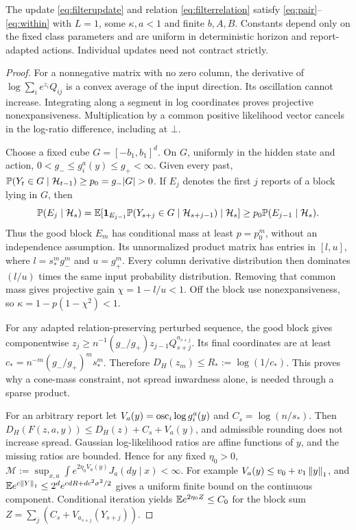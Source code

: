 \begin{lemma}\label{lem:filterblock}
The update \eqref{eq:filterupdate} and relation \eqref{eq:filterrelation} satisfy \eqref{eq:pair}--\eqref{eq:within} with $L=1$, some $\kappa,a<1$ and finite $b,A,B$. Constants depend only on the fixed class parameters and are uniform in deterministic horizon and report-adapted actions. Individual updates need not contract strictly.
\end{lemma}
\begin{proof}
For a nonnegative matrix with no zero column, the derivative of $\log\sum_i e^{z_i}Q_{ij}$ is a convex average of the input direction. Its oscillation cannot increase. Integrating along a segment in log coordinates proves projective nonexpansiveness. Multiplication by a common positive likelihood vector cancels in the log-ratio difference, including at $\bot$.

Choose a fixed cube $G=[-b_1,b_1]^d$. On $G$, uniformly in the hidden state and action, $0<g_-\le g_i^a(y)\le g_+<\infty$. Given every past, $\PP(Y_t\in G\mid\mathcal H_{t-1})\ge p_0=g_-|G|>0$. If $E_j$ denotes the first $j$ reports of a block lying in $G$, then
\[
 \mathbb P(E_j\mid\mathcal H_s)
 =\mathbb E[\mathbf 1_{E_{j-1}}\mathbb P(Y_{s+j}\in G\mid\mathcal H_{s+j-1})\mid\mathcal H_s]
 \ge p_0\mathbb P(E_{j-1}\mid\mathcal H_s).
\]
Thus the good block $E_m$ has conditional mass at least $p=p_0^m$, without an independence assumption. Its unnormalized product matrix has entries in $[l,u]$, where $l=s_*^m g_-^m$ and $u=g_+^m$. Every column derivative distribution then dominates $(l/u)$ times the same input probability distribution. Removing that common mass gives projective gain $\chi=1-l/u<1$. Off the block use nonexpansiveness, so $\kappa=1-p(1-\chi^2)<1$.

For any adapted relation-preserving perturbed sequence, the good block gives componentwise
$z_j\ge n^{-1}(g_-/g_+)z_{j-1}Q_{s+j}^{a_{s+j}}$.
Its final coordinates are at least $c_*=n^{-m}(g_-/g_+)^ms_*^m$. Therefore $D_H(z_m)\le R_*:=\log(1/c_*)$. This proves why a cone-mass constraint, not spread inwardness alone, is needed through a sparse product.

For an arbitrary report let $V_a(y)=\operatorname{osc}_i\log g_i^a(y)$ and $C_s=\log(n/s_*)$. Then $D_H(F(z,a,y))\le D_H(z)+C_s+V_a(y)$, and admissible rounding does not increase spread. Gaussian log-likelihood ratios are affine functions of $y$, and the missing ratios are bounded. Hence for any fixed $\eta_0>0$,
$\mathcal M:=\sup_{x,a}\int e^{2\eta_0 V_a(y)}J_a(dy\mid x)<\infty$.
For example $V_a(y)\le v_0+v_1\left\lVert y\right\rVert_1$, and
$\mathbb E e^{c\left\lVert Y\right\rVert_1}\le2^d e^{cdR+dc^2\sigma^2/2}$ gives a uniform finite bound on the continuous component. Conditional iteration yields $\mathbb E e^{2\eta_0 Z}\le C_0$ for the block sum $Z=\sum_j(C_s+V_{a_{s+j}}(Y_{s+j}))$.


\end{proof}
